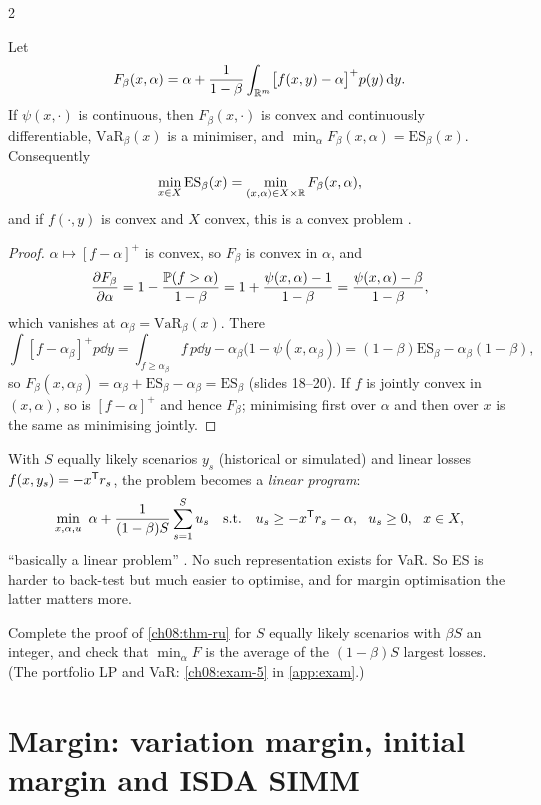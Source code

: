 \begin{paracol}{2}
\begin{theorem}\label{ch08:thm-ru}
Let
\[
  F_\beta(x,\alpha)=\alpha+\frac{1}{1-\beta}\int_{\mathbb{R}^m}\bigl[f(x,y)-\alpha\bigr]^+p(y)\,\mathrm{d} y .
\]
If $\psi(x,\cdot)$ is continuous, then $F_\beta(x,\cdot)$ is convex and continuously differentiable,
$\mathrm{VaR}_\beta(x)$ is a minimiser, and $\min_\alpha F_\beta(x,\alpha)=\mathrm{ES}_\beta(x)$. Consequently
\[
  \min_{x\in X}\mathrm{ES}_\beta(x)=\min_{(x,\alpha)\in X\times\mathbb{R}}F_\beta(x,\alpha),
\]
and if $f(\cdot,y)$ is convex and $X$ convex, this is a convex problem .
\end{theorem}
\begin{proof}
$\alpha\mapsto[f-\alpha]^+$ is convex, so $F_\beta$ is convex in $\alpha$, and
\[
  \frac{\partial F_\beta}{\partial\alpha}=1-\frac{\mathbb{P}(f>\alpha)}{1-\beta}=1+\frac{\psi(x,\alpha)-1}{1-\beta}
  =\frac{\psi(x,\alpha)-\beta}{1-\beta},
\]
which vanishes at $\alpha_\beta=\mathrm{VaR}_\beta(x)$. There
\[
  \int[f-\alpha_\beta]^+p\dd y=\int_{f\ge\alpha_\beta}f\,p\dd y-\alpha_\beta\bigl(1-\psi(x,\alpha_\beta)\bigr)
  =(1-\beta)\mathrm{ES}_\beta-\alpha_\beta(1-\beta),
\]
so $F_\beta(x,\alpha_\beta)=\alpha_\beta+\mathrm{ES}_\beta-\alpha_\beta=\mathrm{ES}_\beta$ (slides 18--20). If $f$ is jointly
convex in $(x,\alpha)$, so is $[f-\alpha]^+$ and hence $F_\beta$; minimising first over $\alpha$ and then over $x$ is
the same as minimising jointly.
\end{proof}
With $S$ equally likely scenarios $y_s$ (historical or simulated) and linear losses $f(x,y_s)=-x^{\mathsf T} r_s$, the problem
becomes a \emph{linear program}:
\[
  \min_{x,\alpha,u}\ \alpha+\frac{1}{(1-\beta)S}\sum_{s=1}^Su_s\quad\text{s.t.}\quad u_s\ge -x\T r_s-\alpha,\ \ u_s\ge0,
  \ \ x\in X ,
\]
``basically a linear problem'' . No such representation exists for VaR. So ES is harder to
back-test but much easier to optimise, and for margin optimisation the latter matters more.

\begin{exercise}\label{ch08:exam-5-short}
Complete the proof of \cref{ch08:thm-ru} for $S$ equally likely scenarios with $\beta S$ an integer, and check that $\min_\alpha F$ is the average of the $(1-\beta)S$ largest losses. (The portfolio LP and VaR: \cref{ch08:exam-5} in \cref{app:exam}.)
\end{exercise}

\section{Margin: variation margin, initial margin and ISDA SIMM}\label{ch08:sec-margin}


\end{paracol}
